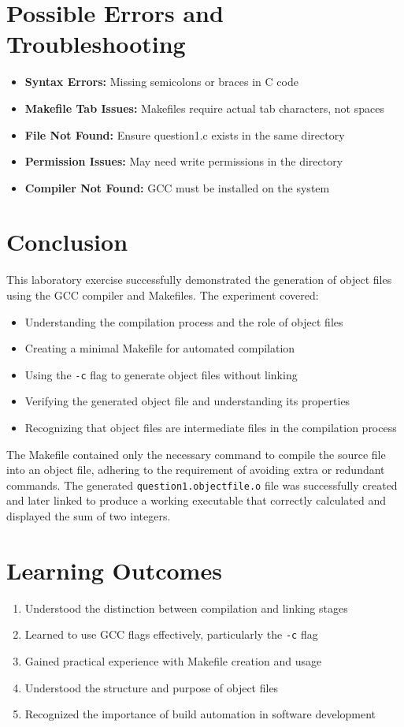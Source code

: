\documentclass[12pt,a4paper]{article}
\begin{document}
\section{Possible Errors and Troubleshooting}
\begin{itemize}
    \item \textbf{Syntax Errors:} Missing semicolons or braces in C code
    \item \textbf{Makefile Tab Issues:} Makefiles require actual tab characters, not spaces
    \item \textbf{File Not Found:} Ensure question1.c exists in the same directory
    \item \textbf{Permission Issues:} May need write permissions in the directory
    \item \textbf{Compiler Not Found:} GCC must be installed on the system
\end{itemize}

\section{Conclusion}
This laboratory exercise successfully demonstrated the generation of object files using the GCC compiler and Makefiles. The experiment covered:

\begin{itemize}
    \item Understanding the compilation process and the role of object files
    \item Creating a minimal Makefile for automated compilation
    \item Using the \texttt{-c} flag to generate object files without linking
    \item Verifying the generated object file and understanding its properties
    \item Recognizing that object files are intermediate files in the compilation process
\end{itemize}

The Makefile contained only the necessary command to compile the source file into an object file, adhering to the requirement of avoiding extra or redundant commands. The generated \texttt{question1.objectfile.o} file was successfully created and later linked to produce a working executable that correctly calculated and displayed the sum of two integers.

\section{Learning Outcomes}
\begin{enumerate}
    \item Understood the distinction between compilation and linking stages
    \item Learned to use GCC flags effectively, particularly the \texttt{-c} flag
    \item Gained practical experience with Makefile creation and usage
    \item Understood the structure and purpose of object files
    \item Recognized the importance of build automation in software development
\end{enumerate}
\end{document}
